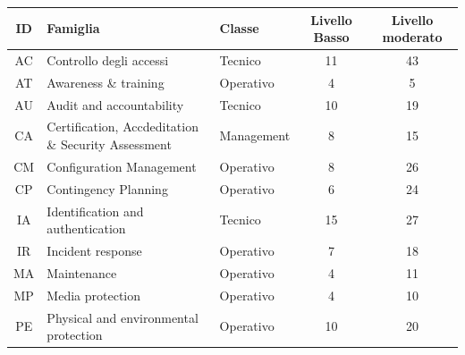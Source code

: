 \documentclass[../main.tex]{subfiles}
\begin{document}
\begin{table}[h]
    \begin{tabulary}{\textwidth}{|C|L|L|C|C|}
    \hline
    \textbf{ID}   & \textbf{Famiglia}                                   & \textbf{Classe} & \textbf{\scriptsize{Livello Basso}} & \textbf{\scriptsize{Livello moderato}} \\ \hline
    AC            & Controllo degli accessi                             & \scriptsize{Tecnico}         & 11                     & 43                        \\ \hline
    AT            & Awareness \& training                               & \scriptsize{Operativo}       & 4                      & 5                        \\ \hline
    AU            & Audit and accountability                            & \scriptsize{Tecnico}         & 10                     & 19                        \\ \hline
    CA            & Certification, Accdeditation \& Security Assessment & \scriptsize{Management}      & 8                      & 15                        \\ \hline
    CM            & Configuration Management                            & \scriptsize{Operativo}       & 8                      & 26                        \\ \hline
    CP            & Contingency Planning                                & \scriptsize{Operativo}       & 6                      & 24                        \\ \hline
    IA            & Identification and authentication                   & \scriptsize{Tecnico}         & 15                     & 27                        \\ \hline
    IR            & Incident response                                   & \scriptsize{Operativo}       & 7                      & 18                        \\ \hline
    MA            & Maintenance                                         & \scriptsize{Operativo}       & 4                      & 11                        \\ \hline
    MP            & Media protection                                    & \scriptsize{Operativo}       & 4                      & 10                        \\ \hline
    PE            & Physical and environmental protection               & \scriptsize{Operativo}       & 10                     & 20                        \\ \hline

\end{tabulary}
\end{table}
\end{document}
